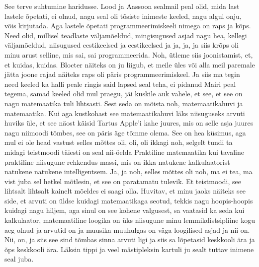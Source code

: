 See terve suhtumine haridusse.
Lood ja Aassoon sealmail peal olid, mida last lastele õpetati, ei olnud, nagu seal oli tõsiste inimeste keeled, nagu algul onju, võis kirjutada. Aga lastele õpetati programmeerimiskeeli nimega on raps ja kõps. Need olid, millisel teadlaste väljamõeldud, mingisugused asjad nagu hea, kellegi väljamõeldud, niisugused eestikeelsed ja eestikeelsed ja ja, ja, ja siis krõps oli minu arust selline, mis sai, sai programmeerida. Noh, ütleme siis joonistamist, et, et kuidas, kuidas.
Blocter näiteks on ju liigub, et meile üles või alla meil paremale jätta joone rajad näiteks raps oli päris programmeerimiskeel. Ja siis ma tegin need keeled ka halli peale ringis said lapsed seal teha, ei pidanud Mairi peal tegema, samad keeled olid mul praegu, jäi kuskile auk vahele, et see, et see on nagu matemaatika tuli lihtsasti. Sest seda on mõista noh, matemaatikahuvi ja matemaatika. Kui aga kustkohast see matemaatikahuvi läks niisuguseks arvuti huviks üle, et see näost käisid Tartus Apple'i kahe juures, mis on selle asja juures nagu niimoodi tõmbes, see on päris äge tõmme olema.
See on hea küsimus, aga mul ei ole head vastust selles mõttes oli, oli, oli ikkagi noh, selgelt tundi ta midagi teistmoodi täiesti on seal nii-öelda Praktiline matemaatika kui tavaline praktiline niisugune rehkendus massi, mis on ikka natukene kalkulaatorist natukene natukene intelligentsem. Ja, ja noh, selles mõttes oli noh, ma ei tea, ma vist juba sel hetkel mõtlesin, et see on paratamatu tulevik. Et teistmoodi, see lihtsalt lihtsalt kainelt mõeldes ei saagi olla. Huvitav, et minu jaoks näiteks see side, et arvuti on üldse kuidagi matemaatikaga seotud, tekkis nagu hoopis-hoopis kuidagi nagu hiljem, aga sinul on see kohene valgusest, sa vaatasid ka seda kui kalkulaator, matemaatiline loogika on üks niisugune minu lemmikdistsipliine kogu aeg olnud ja arvutid on ja muusika muuhulgas on väga loogilised asjad ja nii on. Nii, on, ja siis see sind tõmbas sinna arvuti ligi ja siis sa lõpetasid keskkooli ära ja õps keskkooli ära.
Läksin tippi ja veel mästipleksin kartuli ju sealt tuttav inimene seal juba.
